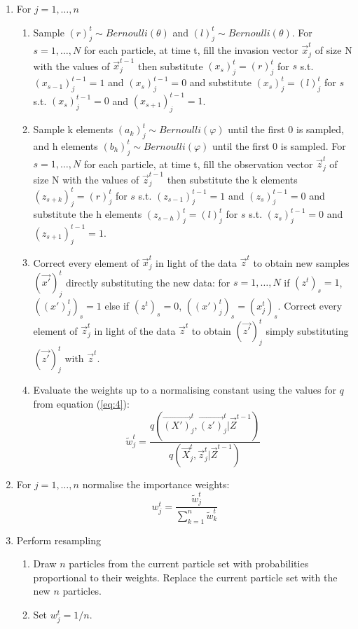 \begin{algorithm}[H]
\begin{algorithmic}
\begin{enumerate}
	\item For $j = 1, \dots , n$
	\begin{enumerate}
  		\item Sample $(r)^t_j \sim Bernoulli(\theta)$ and $(l)^t_j \sim Bernoulli(\theta)$. For $s = 1, \dots, N$ for each particle, at time t, fill the invasion vector $\vec{x}_j^t$ of size N with the values of $\vec{x}_j^{t-1}$ then substitute $(x_s)^t_j = (r)^t_j$ for $s$ s.t. $(x_{s-1})^{t-1}_j = 1$ and $(x_s)^{t-1}_j = 0$ and substitute $(x_s)^t_j = (l)^t_j$ for $s$ s.t. $(x_s)^{t-1}_j = 0$ and $(x_{s+1})^{t-1}_j = 1$.
  		\item Sample k elements $(a_k)^t_j \sim Bernoulli(\varphi)$ until the first 0 is sampled, and h elements $(b_h)^t_j \sim Bernoulli(\varphi)$ until the first 0 is sampled. For $s = 1, \dots, N$ for each particle, at time t, fill the observation vector $\vec{z}_j^t$ of size N with the values of $\vec{z}_j^{t-1}$ then substitute the k elements $(z_{s+k})^t_j = (r)^t_j$ for $s$ s.t. $(z_{s-1})^{t-1}_j = 1$ and $(z_s)^{t-1}_j = 0$ and substitute the h elements $(z_{s-h})^t_j = (l)^t_j$ for $s$ s.t. $(z_s)^{t-1}_j = 0$ and $(z_{s+1})^{t-1}_j = 1$.
		\item Correct every element of $\vec{x}^t_j$ in light of the data $\vec{z}^t$ to obtain new samples $(\vec{x'})^t_j$ directly substituting the new data: for $s = 1, \dots ,N$ if $(z^t)_s = 1$, $((x')_j^t)_s = 1$ else if $(z^t)_s = 0$, $((x')_j^t)_s = (x^t_j)_s$. Correct every element of $\vec{z}^t_j$ in light of the data $\vec{z}^t$ to obtain $(\vec{z'})^t_j$ simply substituting $(\vec{z'})^t_j$ with $\vec{z}^t$.
		\item Evaluate the weights up to a normalising constant using the values for $q$ from equation (\ref{eq:4}):
		\[
		\tilde{w}^{t}_{j} = \frac{q(\vec{(X')}^{t}_j, \vec{(z')}^{t}_j | \vec{Z}^{t-1})}{q(\vec{X}^{t}_j, \vec{z}^{t}_j | \vec{Z}^{t-1})}
		\]
	\end{enumerate}
	\item For $j = 1, \dots , n$ normalise the importance weights:
	\[
	w^{t}_{j} = \frac{\tilde{w}^t_j}{\sum_{k=1}^{n}\tilde{w}^{t}_k}
	\]
	\item Perform resampling
	\begin{enumerate}
	    \item Draw $n$ particles from the current particle set with probabilities proportional to their weights. Replace the current particle set with the new $n$ particles.
	    \item Set $w^t_j=1/n$.
	\end{enumerate}
\end{enumerate}
  
 \end{algorithmic}
\end{algorithm}



